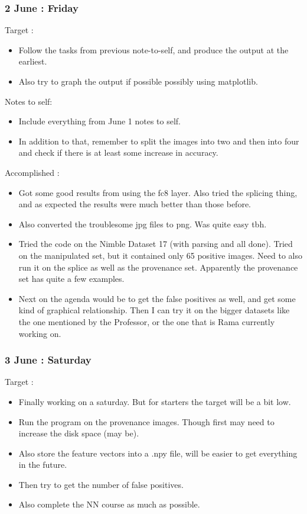 \documentclass{article}
\begin{document}
\subsubsection{2 June : Friday}
Target :
\begin{itemize}
\item Follow the tasks from previous note-to-self, and produce the output at the earliest.
\item Also try to graph the output if possible possibly using matplotlib.
\end{itemize}


Notes to self:
\begin{itemize}
\item Include everything from June 1 notes to self.
\item In addition to that, remember to split the images into two and then into four and check if there is at least some increase in accuracy.
\end{itemize}

Accomplished :
\begin{itemize}
\item Got some good results from using the fc8 layer. Also tried the splicing thing, and as expected the results were much better than those before.
\item Also converted the troublesome jpg files to png. Was quite easy tbh.
\item Tried the code on the Nimble Dataset 17 (with parsing and all done). Tried on the manipulated set, but it contained only 65 positive images. Need to also run it on the splice as well as the provenance set. Apparently the provenance set has quite a few examples.
\item Next on the agenda would be to get the false positives as well, and get some kind of graphical relationship. Then I can try it on the bigger datasets like the one mentioned by the Professor, or the one that is Rama currently working on.
\end{itemize}

\subsubsection{3 June : Saturday}
Target :
\begin{itemize}
\item Finally working on a saturday. But for starters the target will be a bit low.
\item Run the program on the provenance images. Though first may need to increase the disk space (may be).
\item Also store the feature vectors into a .npy file, will be easier to get everything in the future.
\item Then try to get the number of false positives.
\item Also complete the NN course as much as possible.
\end{itemize}
\end{document}
